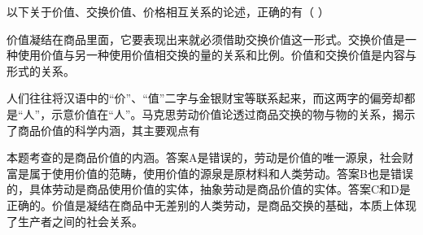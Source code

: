 \question 以下关于价值、交换价值、价格相互关系的论述，正确的有（ ）
\par\twoch{\textcolor{red}{价值是交换价值的基础}}{\textcolor{red}{价值是价格的基础}}{\textcolor{red}{价格是交换价值的一种形式}}{\textcolor{red}{价值要借助交换价值和价格表现出来}}
\begin{solution}价值凝结在商品里面，它要表现出来就必须借助交换价值这一形式。交换价值是一种使用价值与另一种使用价值相交换的量的关系和比例。价值和交换价值是内容与形式的关系。
\end{solution}
\question 人们往往将汉语中的``价''、``值''二字与金银财宝等联系起来，而这两字的偏旁却都是``人''，示意价值在``人''。马克思劳动价值论透过商品交换的物与物的关系，揭示了商品价值的科学内涵，其主要观点有
\par{}
\begin{solution}本题考查的是商品价值的内涵。答案A是错误的，劳动是价值的唯一源泉，社会财富是属于使用价值的范畴，使用价值的源泉是原材料和人类劳动。答案B也是错误的，具体劳动是商品使用价值的实体，抽象劳动是商品价值的实体。答案C和D是正确的。价值是凝结在商品中无差别的人类劳动，是商品交换的基础，本质上体现了生产者之间的社会关系。
\end{solution}
